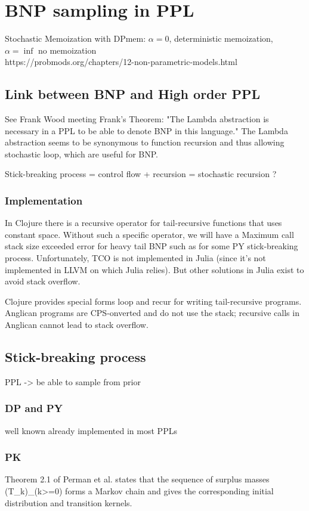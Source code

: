 
\chapter{BNP sampling in PPL}

Stochastic Memoization with DPmem: $\alpha = 0$, deterministic memoization, $\alpha = \inf$ no memoization\\
https://probmods.org/chapters/12-non-parametric-models.html


\section{Link between BNP and High order PPL}
See Frank Wood meeting
Frank's Theorem: "The Lambda abstraction is necessary in a PPL to be able to denote BNP in this language." The Lambda abstraction seems to be synonymous to function recursion and thus allowing stochastic loop, which are useful for BNP.

Stick-breaking process = control flow + recursion = stochastic recursion ?

\subsection{Implementation}
In Clojure there is a recursive operator for tail-recursive functions that uses constant space. Without such a specific operator, we will have a Maximum call stack size exceeded error for heavy tail BNP such as for some PY stick-breaking process. Unfortunately, \gls{TCO} is not implemented in Julia (since it's not implemented in LLVM on which Julia relies). But other solutions in Julia exist to avoid stack overflow.

Clojure provides special forms loop and recur for writing tail-recursive programs. Anglican programs are \gls{CPS}-onverted and do not use the stack; recursive calls in Anglican cannot lead to stack overflow.

\section{Stick-breaking process}
PPL -> be able to sample from prior

\subsection{DP and PY}
well known
already implemented in most \gls{PPL}s

\subsection{PK}
Theorem 2.1 of Perman et al. states that the sequence of surplus masses (T_k)_(k>=0) forms a Markov chain and gives the corresponding initial distribution and transition kernels.

